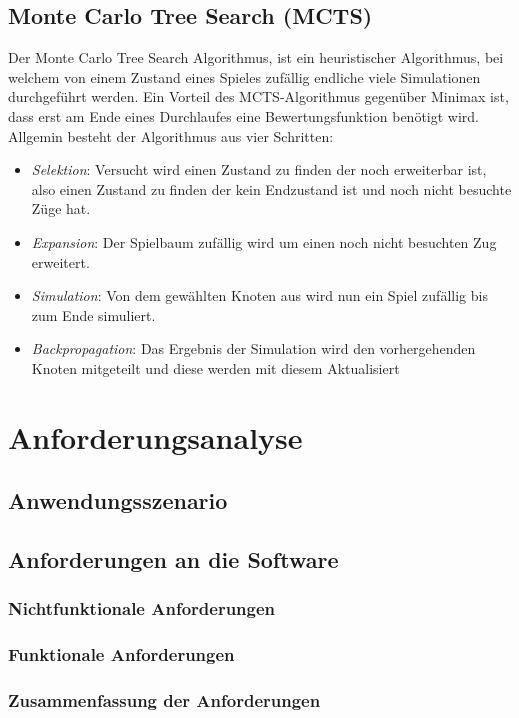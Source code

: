 \documentclass[12pt,a4paper,bibliography=totocnumbered,listof=totocnumbered]{article}
\begin{document}
\subsection{Monte Carlo Tree Search (MCTS)}
Der Monte Carlo Tree Search Algorithmus, ist ein heuristischer Algorithmus, bei welchem von einem
Zustand eines Spieles zufällig endliche viele Simulationen durchgeführt werden. Ein Vorteil des 
MCTS-Algorithmus gegenüber Minimax ist, dass erst am Ende eines Durchlaufes eine Bewertungsfunktion
benötigt wird. Allgemin besteht der Algorithmus aus vier Schritten:
\begin{itemize}
    \item \textit{Selektion}: Versucht wird einen Zustand zu finden der noch erweiterbar ist, also
        einen Zustand zu finden der kein Endzustand ist und noch nicht besuchte Züge hat.
    \item \textit{Expansion}: Der Spielbaum zufällig wird um einen noch nicht besuchten Zug erweitert.
    \item \textit{Simulation}: Von dem gewählten Knoten aus wird nun ein Spiel zufällig bis zum Ende 
        simuliert. 
    \item \textit{Backpropagation}: Das Ergebnis der Simulation wird den vorhergehenden Knoten mitgeteilt
        und diese werden mit diesem Aktualisiert
\end{itemize}

\section{Anforderungsanalyse}
\subsection{Anwendungsszenario}
\subsection{Anforderungen an die Software}
\subsubsection{Nichtfunktionale Anforderungen}
\subsubsection{Funktionale Anforderungen}
\subsubsection{Zusammenfassung der Anforderungen}
\end{document}
